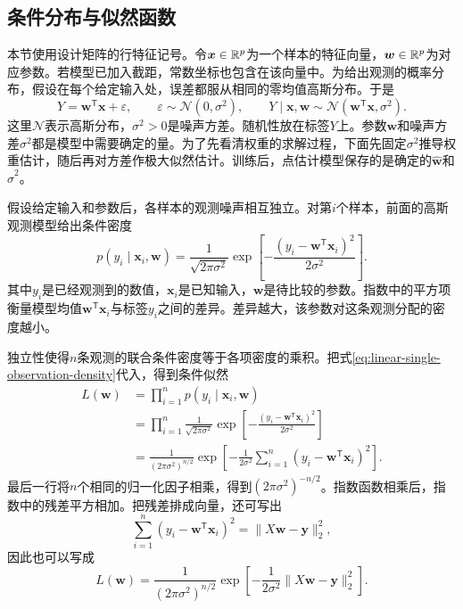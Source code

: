 \subsection{条件分布与似然函数}
本节使用设计矩阵的行特征记号。令$\bm x\in\mathbb{R}^p$为一个样本的特征向量，$\bm w\in\mathbb{R}^p$为对应参数。若模型已加入截距，常数坐标也包含在该向量中。为给出观测的概率分布，假设在每个给定输入处，误差都服从相同的零均值高斯分布。于是
\begin{equation}
 Y=\bm w^{\mathsf T}\bm x+\varepsilon,\qquad
 \varepsilon\sim\mathcal N(0,\sigma^2),\qquad
 Y\mid\bm x,\bm w\sim\mathcal N(\bm w^{\mathsf T}\bm x,\sigma^2).
\end{equation}
这里$\mathcal N$表示高斯分布，$\sigma^2>0$是噪声方差。随机性放在标签$Y$上。参数$\bm w$和噪声方差$\sigma^2$都是模型中需要确定的量。为了先看清权重的求解过程，下面先固定$\sigma^2$推导权重估计，随后再对方差作极大似然估计。训练后，点估计模型保存的是确定的$\hat{\bm w}$和$\hat{\sigma}^2$。

假设给定输入和参数后，各样本的观测噪声相互独立。对第$i$个样本，前面的高斯观测模型给出条件密度
\begin{equation}
 p(y_i\mid\bm x_i,\bm w)
 =\frac{1}{\sqrt{2\pi\sigma^2}}
 \exp\left[-\frac{(y_i-\bm w^{\mathsf T}\bm x_i)^2}{2\sigma^2}\right].
 \label{eq:linear-single-observation-density}
\end{equation}
其中$y_i$是已经观测到的数值，$\bm x_i$是已知输入，$\bm w$是待比较的参数。指数中的平方项衡量模型均值$\bm w^{\mathsf T}\bm x_i$与标签$y_i$之间的差异。差异越大，该参数对这条观测分配的密度越小。

独立性使得$n$条观测的联合条件密度等于各项密度的乘积。把式\eqref{eq:linear-single-observation-density}代入，得到条件似然
\begin{align}
 L(\bm w)
 &=\prod_{i=1}^n p(y_i\mid\bm x_i,\bm w)\\
 &=\prod_{i=1}^n
 \frac{1}{\sqrt{2\pi\sigma^2}}
 \exp\left[-\frac{(y_i-\bm w^{\mathsf T}\bm x_i)^2}{2\sigma^2}\right]\\
 &=\frac{1}{(2\pi\sigma^2)^{n/2}}
 \exp\left[-\frac{1}{2\sigma^2}
 \sum_{i=1}^n(y_i-\bm w^{\mathsf T}\bm x_i)^2\right].
 \label{eq:linear-likelihood-expanded}
\end{align}
最后一行将$n$个相同的归一化因子相乘，得到$(2\pi\sigma^2)^{-n/2}$。指数函数相乘后，指数中的残差平方相加。把残差排成向量，还可写出
\begin{equation}
 \sum_{i=1}^n(y_i-\bm w^{\mathsf T}\bm x_i)^2
 =\|X\bm w-\bm y\|_2^2,
\end{equation}
因此也可以写成
\begin{equation}
 L(\bm w)=\frac{1}{(2\pi\sigma^2)^{n/2}}
 \exp\left[-\frac{1}{2\sigma^2}
 \|X\bm w-\bm y\|_2^2\right].
 \end{equation}


